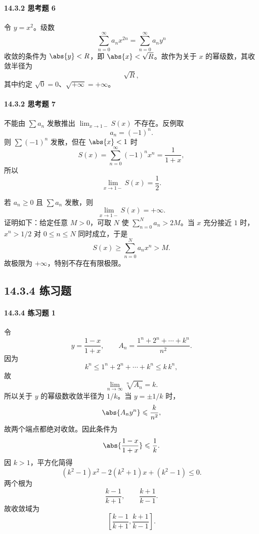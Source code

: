 \paragraph{14.3.2 思考题 6}
\begin{xsolution}
令 $y=x^2$。级数
\[
  \sum_{n=0}^{\infty}a_nx^{2n}
  =\sum_{n=0}^{\infty}a_ny^n
\]
收敛的条件为 $\abs{y}<R$，即 $\abs{x}<\sqrt R$。故作为关于 $x$ 的幂级数，其收敛半径为
\[
  \sqrt R,
\]
其中约定 $\sqrt0=0$、$\sqrt{+\infty}=+\infty$。
\end{xsolution}

\paragraph{14.3.2 思考题 7}
\begin{xsolution}
不能由 $\sum a_n$ 发散推出 $\lim_{x\to1-}S(x)$ 不存在。反例取
\[
  a_n=(-1)^n.
\]
则 $\sum(-1)^n$ 发散，但在 $\abs{x}<1$ 时
\[
  S(x)=\sum_{n=0}^{\infty}(-1)^nx^n=\frac1{1+x},
\]
所以
\[
  \lim_{x\to1-}S(x)=\frac12.
\]

若 $a_n\geqslant0$ 且 $\sum a_n$ 发散，则
\[
  \lim_{x\to1-}S(x)=+\infty.
\]
证明如下：给定任意 $M>0$，可取 $N$ 使 $\sum_{n=0}^Na_n>2M$。当 $x$ 充分接近 $1$ 时，$x^n>1/2$ 对 $0\leqslant n\leqslant N$ 同时成立，于是
\[
  S(x)\geqslant\sum_{n=0}^Na_nx^n>M.
\]
故极限为 $+\infty$，特别不存在有限极限。
\end{xsolution}

\subsection*{14.3.4 练习题}

\paragraph{14.3.4 练习题 1}
\begin{xsolution}
令
\[
  y=\frac{1-x}{1+x},
  \qquad
  A_n=\frac{1^n+2^n+\cdots+k^n}{n^2}.
\]
因为
\[
  k^n\leqslant1^n+2^n+\cdots+k^n\leqslant k\,k^n,
\]
故
\[
  \lim_{n\to\infty}\sqrt[n]{A_n}=k.
\]
所以关于 $y$ 的幂级数收敛半径为 $1/k$。当 $y=\pm1/k$ 时，
\[
  \abs{A_ny^n}
  \leqslant\frac{k}{n^2},
\]
故两个端点都绝对收敛。因此条件为
\[
  \abs{\frac{1-x}{1+x}}\leqslant\frac1k.
\]
因 $k>1$，平方化简得
\[
  (k^2-1)x^2-2(k^2+1)x+(k^2-1)\leqslant0.
\]
两个根为
\[
  \frac{k-1}{k+1},\qquad \frac{k+1}{k-1}.
\]
故收敛域为
\[
  \boxed{\left[\frac{k-1}{k+1},\frac{k+1}{k-1}\right]}.
\]
\end{xsolution}

